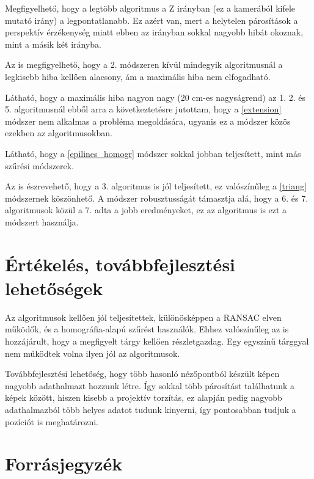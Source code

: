 \documentclass{article}
\begin{document}
	Megfigyelhető, hogy a legtöbb algoritmus a Z irányban (ez a kamerából kifele mutató irány) a legpontatlanabb. Ez azért van, mert a helytelen párosítások a perspektív érzékenység miatt ebben az irányban sokkal nagyobb hibát okoznak, mint a másik két irányba.
	
	Az is megfigyelhető, hogy a 2. módszeren kívül mindegyik algoritmusnál a legkisebb hiba kellően alacsony, ám a maximális hiba nem elfogadható.
	
	Látható, hogy a maximális hiba nagyon nagy (20 cm-es nagyságrend) az 1. 2. és 5. algoritmusnál ebből arra a következtetésre jutottam, hogy a \ref{extension} módszer nem alkalmas a probléma megoldására, ugyanis ez a módszer közös ezekben az algoritmusokban.
	
	Látható, hogy a \ref{epilines_homogr} módszer sokkal jobban teljesített, mint más szűrési módszerek.
	
	Az is észrevehető, hogy a 3. algoritmus is jól teljesített, ez valószínűleg a \ref{triang} módszernek köszönhető. A módszer robusztusságát támasztja alá, hogy a 6. és 7. algoritmusok közül a 7. adta a jobb eredményeket, ez az algoritmus is ezt a módszert használja.
	
\newpage
\section{Értékelés, továbbfejlesztési lehetőségek}
	Az algoritmusok kellően jól teljesítettek, különösképpen a RANSAC elven működők, és a homográfia-alapú szűrést használók. Ehhez valószínűleg az is hozzájárult, hogy a megfigyelt tárgy kellően részletgazdag. Egy egyszínű tárggyal nem működtek volna ilyen jól az algoritmusok.
	
	Továbbfejlesztési lehetőség, hogy több hasonló nézőpontból készült képen nagyobb adathalmazt hozzunk létre. Így sokkal több párosítást találhatunk a képek között, hiszen kisebb a projektív torzítás, ez alapján pedig nagyobb adathalmazból több helyes adatot tudunk kinyerni, így pontosabban tudjuk a pozíciót is meghatározni.

\newpage
\section{Forrásjegyzék}
\end{document}
